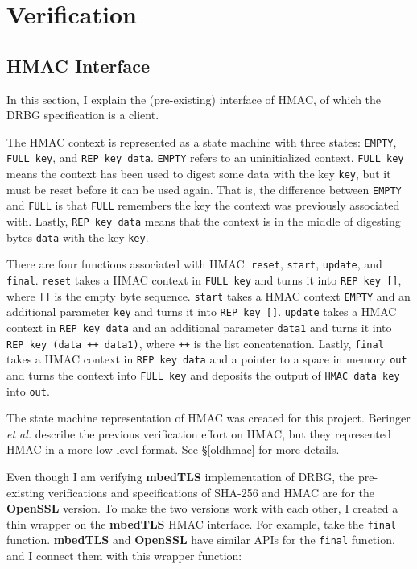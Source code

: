 \documentclass[pageno]{jpaper}
\newcommand{\stdtitle}[1]{\textbf{#1}}
\begin{document}
\section{Verification}
\subsection{HMAC Interface}\label{hmac_interface}
In this section, I explain the (pre-existing) interface of HMAC, of which the DRBG specification is a client.

The HMAC context is represented as a state machine with three states: \lstinline{EMPTY}, \lstinline{FULL key}, and \lstinline{REP key data}. \lstinline{EMPTY} refers to an uninitialized context. \lstinline{FULL key} means the context has been used to digest some data with the key \lstinline{key}, but it must be reset before it can be used again. That is, the difference between \lstinline{EMPTY} and \lstinline{FULL} is that \lstinline{FULL} remembers the key the context was previously associated with. Lastly, \lstinline{REP key data} means that the context is in the middle of digesting bytes \lstinline{data} with the key \lstinline{key}.

There are four functions associated with HMAC: \lstinline{reset}, \lstinline{start}, \lstinline{update}, and \lstinline{final}. \lstinline{reset} takes a HMAC context in \lstinline{FULL key} and turns it into \lstinline{REP key []}, where \lstinline{[]} is the empty byte sequence. \lstinline{start} takes a HMAC context \lstinline{EMPTY} and an additional parameter \lstinline{key} and turns it into \lstinline{REP key []}. \lstinline{update} takes a HMAC context in \lstinline{REP key data} and an additional parameter \lstinline{data1} and turns it into \lstinline{REP key (data ++ data1)}, where \lstinline{++} is the list concatenation. Lastly, \lstinline{final} takes a HMAC context in \lstinline{REP key data} and a pointer to a space in memory \lstinline{out} and turns the context into \lstinline{FULL key} and deposits the output of \lstinline{HMAC data key} into \lstinline{out}.

The state machine representation of HMAC was created for this project. Beringer \textit{et al.} \cite{hmac} describe the previous verification effort on HMAC, but they represented HMAC in a more low-level format. See \S \ref{oldhmac} for more details.

Even though I am verifying \stdtitle{mbedTLS} implementation of DRBG, the pre-existing verifications and specifications of SHA-256 and HMAC are for the \stdtitle{OpenSSL} version. To make the two versions work with each other, I created a thin wrapper on the \stdtitle{mbedTLS} HMAC interface. For example, take the \lstinline{final} function. \stdtitle{mbedTLS} and \stdtitle{OpenSSL} have similar APIs for the \lstinline{final} function, and I connect them with this wrapper function:
\end{document}
